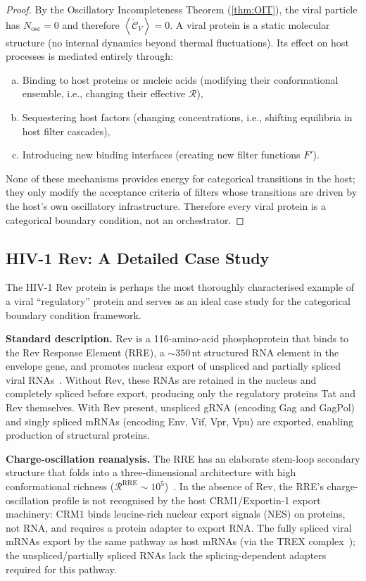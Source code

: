 \documentclass[12pt,a4paper]{article}
\theoremstyle{definition}
\theoremstyle{remark}
\newcommand{\Nosc}{N_{\mathrm{osc}}}
\newcommand{\Rcat}{\mathcal{R}}
\newcommand{\avg}[1]{\left\langle #1 \right\rangle}
\begin{document}
\begin{proof}
By the Oscillatory Incompleteness Theorem (\cref{thm:OIT}), the viral particle has $\Nosc = 0$ and therefore $\avg{\dot{\mathcal{C}}_V} = 0$. A viral protein is a static molecular structure (no internal dynamics beyond thermal fluctuations). Its effect on host processes is mediated entirely through:
\begin{enumerate}[(a)]
  \item Binding to host proteins or nucleic acids (modifying their conformational ensemble, i.e., changing their effective $\Rcat$),
  \item Sequestering host factors (changing concentrations, i.e., shifting equilibria in host filter cascades),
  \item Introducing new binding interfaces (creating new filter functions $F'$).
\end{enumerate}
None of these mechanisms provides energy for categorical transitions in the host; they only modify the acceptance criteria of filters whose transitions are driven by the host's own oscillatory infrastructure. Therefore every viral protein is a categorical boundary condition, not an orchestrator.
\end{proof}

\subsection{HIV-1 Rev: A Detailed Case Study}

The HIV-1 Rev protein is perhaps the most thoroughly characterised example of a viral ``regulatory'' protein and serves as an ideal case study for the categorical boundary condition framework.

\textbf{Standard description.} Rev is a 116-amino-acid phosphoprotein that binds to the Rev Response Element (RRE), a $\sim\!350$\,nt structured RNA element in the envelope gene, and promotes nuclear export of unspliced and partially spliced viral RNAs~\cite{Malim1989,Cullen1998}. Without Rev, these RNAs are retained in the nucleus and completely spliced before export, producing only the regulatory proteins Tat and Rev themselves. With Rev present, unspliced gRNA (encoding Gag and GagPol) and singly spliced mRNAs (encoding Env, Vif, Vpr, Vpu) are exported, enabling production of structural proteins.

\textbf{Charge-oscillation reanalysis.} The RRE has an elaborate stem-loop secondary structure that folds into a three-dimensional architecture with high conformational richness ($\Rcat^{\mathrm{RRE}} \sim 10^5$)~\cite{Bai2014}. In the absence of Rev, the RRE's charge-oscillation profile is not recognised by the host CRM1/Exportin-1 export machinery: CRM1 binds leucine-rich nuclear export signals (NES) on proteins, not RNA, and requires a protein adapter to export RNA. The fully spliced viral mRNAs export by the same pathway as host mRNAs (via the TREX complex~\cite{Strasser2002}); the unspliced/partially spliced RNAs lack the splicing-dependent adapters required for this pathway.
\end{document}
